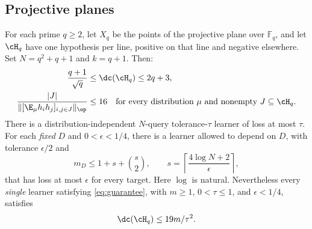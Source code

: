 \subsection{Projective planes}
\begin{theorem}\label{thm:plane}
For each prime $q\geq2$, let $X_q$ be the points of the projective plane over $\mathbb F_q$, and let $\cH_q$ have one hypothesis per line, positive on that line and negative elsewhere. Set $N=q^2+q+1$ and $k=q+1$. Then:
\begin{align}
 \frac{q+1}{\sqrt q}&\leq\dc(\cH_q)\leq2q+3,\label{eq:planedc}\\
 \frac{|J|}{\|[\E_\mu h_i h_j]_{i,j\in J}\|_\op}&\leq16
 \quad\text{for every distribution $\mu$ and nonempty $J\subseteq\cH_q$}.
 \label{eq:planeplain}
\end{align}
There is a distribution-independent $N$-query tolerance-$\tau$ learner of loss at most $\tau$. For each \emph{fixed} $D$ and $0<\epsilon<1/4$, there is a learner allowed to depend on $D$, with tolerance $\epsilon/2$ and
\[
 m_D\leq1+s+\binom{s}{2},\qquad
 s=\left\lceil\frac{4\log N+2}{\epsilon}\right\rceil,
\]
that has loss at most $\epsilon$ for every target. Here $\log$ is natural.
Nevertheless every \emph{single} learner satisfying \eqref{eq:guarantee}, with $m\geq1$, $0<\tau\leq1$, and $\epsilon<1/4$, satisfies
\begin{equation}\label{eq:plane19}
 \dc(\cH_q)\leq19m/\tau^2.
\end{equation}
\end{theorem}
